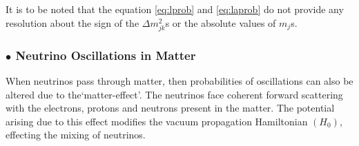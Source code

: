 It is to be noted that the equation \ref{eq:lprob} and \ref{eq:laprob}
do not provide any resolution about the sign of the $\Delta m_{jk}^{2}$s
or the absolute values of $m_{j}$s.

\subsubsection{$\bullet$ Neutrino Oscillations in Matter}

When neutrinos pass through matter, then probabilities of oscillations
can also be altered due to the`matter-effect'. The neutrinos face
coherent forward scattering with the electrons, protons and neutrons
present in the matter\cite{mattereffect}. The potential arising due to
this effect modifies the vacuum propagation Hamiltonian
$\left(H_{0}\right)$, effecting the mixing of neutrinos.

